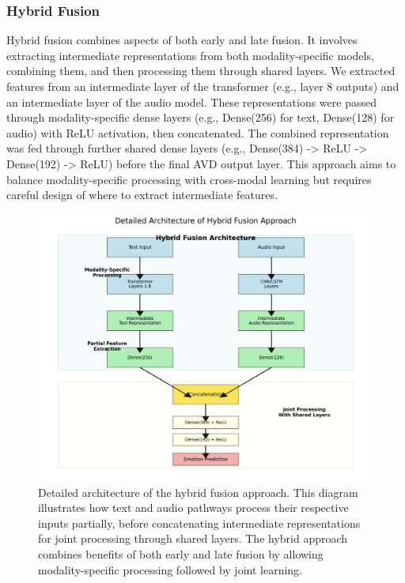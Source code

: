 \documentclass[12pt]{article}
\begin{document}
\subsubsection{Hybrid Fusion}
Hybrid fusion combines aspects of both early and late fusion. It involves extracting intermediate representations from both modality-specific models, combining them, and then processing them through shared layers. We extracted features from an intermediate layer of the transformer (e.g., layer 8 outputs) and an intermediate layer of the audio model. These representations were passed through modality-specific dense layers (e.g., Dense(256) for text, Dense(128) for audio) with ReLU activation, then concatenated. The combined representation was fed through further shared dense layers (e.g., Dense(384) -> ReLU -> Dense(192) -> ReLU) before the final AVD output layer. This approach aims to balance modality-specific processing with cross-modal learning but requires careful design of where to extract intermediate features.

\begin{figure}[h]
    \centering
    \includegraphics[width=0.9\linewidth]{Figures/hybrid_fusion_detailed.png}
    \caption{Detailed architecture of the hybrid fusion approach. This diagram illustrates how text and audio pathways process their respective inputs partially, before concatenating intermediate representations for joint processing through shared layers. The hybrid approach combines benefits of both early and late fusion by allowing modality-specific processing followed by joint learning.}
    \label{fig:hybrid_fusion}
\end{figure}
\end{document}
